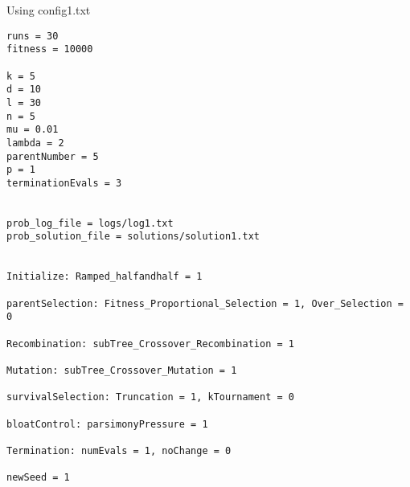 \documentclass[•]{article}
\begin{document}
Using config1.txt 
\begin{lstlisting}
runs = 30
fitness = 10000

k = 5
d = 10
l = 30
n = 5
mu = 0.01
lambda = 2
parentNumber = 5
p = 1
terminationEvals = 3


prob_log_file = logs/log1.txt
prob_solution_file = solutions/solution1.txt


Initialize: Ramped_halfandhalf = 1

parentSelection: Fitness_Proportional_Selection = 1, Over_Selection = 0

Recombination: subTree_Crossover_Recombination = 1

Mutation: subTree_Crossover_Mutation = 1

survivalSelection: Truncation = 1, kTournament = 0

bloatControl: parsimonyPressure = 1

Termination: numEvals = 1, noChange = 0

newSeed = 1
\end{lstlisting}
\end{document}
